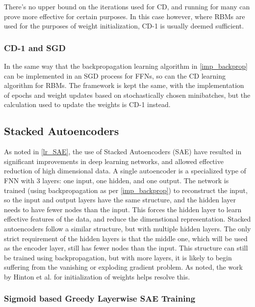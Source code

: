 \documentclass[a4paper,11pt,oneside]{article}
\theoremstyle{plain}
\theoremstyle{definition}
\begin{document}
There's no upper bound on the iterations used for CD, and running for many can prove more effective for certain purposes. In this case however, where RBMs are used for the purposes of weight initialization, CD-1 is usually deemed sufficient.

\subsubsection{CD-1 and SGD}

In the same way that the backpropagation learning algorithm in \ref{imp_backprop} can be implemented in an SGD process for FFNs, so can the CD learning algorithm for RBMs. The framework is kept the same, with the implementation of epochs and weight updates based on stochastically chosen minibatches, but the calculation used to update the weights is CD-1 instead.


\subsection{Stacked Autoencoders}\label{imp_SAE}

As noted in \ref{lr_SAE}, the use of Stacked Autoencoders (SAE) have resulted in significant improvements in deep learning networks, and allowed effective reduction of high dimensional data. A single autoencoder is a specialized type of FNN with 3 layers: one input, one hidden, and one output. The network is trained (using backpropagation as per \ref{imp_backprop}) to reconstruct the input, so the input and output layers have the same structure, and the hidden layer needs to have fewer nodes than the input. This forces the hidden layer to learn effective features of the data, and reduce the dimenstional representation. 
\newline\newline
Stacked autoencoders follow a similar structure, but with multiple hidden layers. The only strict requirement of the hidden layers is that the middle one, which will be used as the encoder layer, still has fewer nodes than the input. This structure can still be trained using backpropagation, but with more layers, it is likely to begin suffering from the vanishing or exploding gradient problem. As noted, the work by Hinton et al. for initialization of weights helps resolve this.

\subsubsection{Sigmoid based Greedy Layerwise SAE Training}\label{imp_sigmoidsae}
\end{document}
